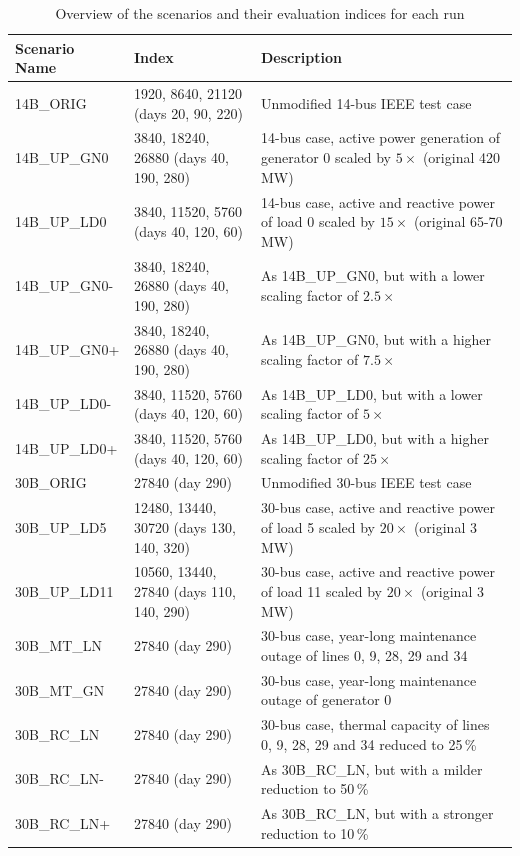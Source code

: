 \begin{table}[htbp]
\centering
\small
\renewcommand{\arraystretch}{1.3}
\begin{tabular}{|l|p{4.6cm}|p{6cm}|}
\hline
\textbf{Scenario Name} & \textbf{Index} & \textbf{Description} \\
\hline
14B\_ORIG & 1920, 8640, 21120 (days 20, 90, 220) & Unmodified 14-bus IEEE test case \\
\hline
14B\_UP\_GN0 & 3840, 18240, 26880 (days 40, 190, 280) & 14-bus case, active power generation of generator 0 scaled by $5\times$ (original 420\,MW) \\
\hline
14B\_UP\_LD0 & 3840, 11520, 5760 (days 40, 120, 60) & 14-bus case, active and reactive power of load 0 scaled by $15\times$ (original 65-70\,MW)\\
\hline
14B\_UP\_GN0- & 3840, 18240, 26880 (days 40, 190, 280) & As 14B\_UP\_GN0, but with a lower scaling factor of $2.5\times$ \\
\hline
14B\_UP\_GN0+ & 3840, 18240, 26880 (days 40, 190, 280) & As 14B\_UP\_GN0, but with a higher scaling factor of $7.5\times$ \\
\hline
14B\_UP\_LD0- & 3840, 11520, 5760 (days 40, 120, 60) & As 14B\_UP\_LD0, but with a lower scaling factor of $5\times$ \\
\hline
14B\_UP\_LD0+ & 3840, 11520, 5760 (days 40, 120, 60) & As 14B\_UP\_LD0, but with a higher scaling factor of $25\times$ \\
\hline
30B\_ORIG & 27840 (day 290) & Unmodified 30-bus IEEE test case \\
\hline
30B\_UP\_LD5 & 12480, 13440, 30720 (days 130, 140, 320) & 30-bus case, active and reactive power of load 5 scaled by $20\times$ (original 3\,MW) \\
\hline
30B\_UP\_LD11 & 10560, 13440, 27840 (days 110, 140, 290) & 30-bus case, active and reactive power of load 11 scaled by $20\times$ (original 3\,MW) \\
\hline
30B\_MT\_LN & 27840 (day 290) & 30-bus case, year-long maintenance outage of lines 0, 9, 28, 29 and 34 \\
\hline
30B\_MT\_GN & 27840 (day 290) & 30-bus case, year-long maintenance outage of generator 0 \\
\hline
30B\_RC\_LN & 27840 (day 290) & 30-bus case, thermal capacity of lines 0, 9, 28, 29 and 34 reduced to 25\,\% \\
\hline
30B\_RC\_LN- & 27840 (day 290) & As 30B\_RC\_LN, but with a milder reduction to 50\,\% \\
\hline
30B\_RC\_LN+ & 27840 (day 290) & As 30B\_RC\_LN, but with a stronger reduction to 10\,\% \\
\hline
\end{tabular}
\caption{Overview of the scenarios and their evaluation indices for each run}
\label{tab:scenarios-setup}
\end{table}


